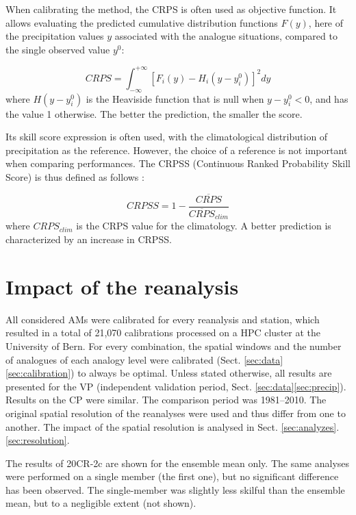 \documentclass{ametsoc}
\begin{document}
When calibrating the method, the CRPS \citep[Continuous Ranked Probability Score,][]{Brown1974, Matheson1976, Hersbach2000} is often used as objective function. It allows evaluating the predicted cumulative distribution functions $F(y)$, here of the precipitation values $y$ associated with the analogue situations, compared to the single observed value $y^{0}$:

\begin{equation}
\label{eq:CRPS}
CRPS = \int_{-\infty}^{+\infty} \left[ F_{i}(y)-H_{i}(y-y_{i}^{0})\right]^{2} dy
\end{equation}
where $H(y-y_{i}^{0})$ is the Heaviside function that is null when $y-y_{i}^{0}<0$, and has the value 1 otherwise. The better the prediction, the smaller the score.

Its skill score expression is often used, with the climatological distribution of precipitation as the reference. However, the choice of a reference is not important when comparing performances. The CRPSS (Continuous Ranked Probability Skill Score) is thus defined as follows \citep{Bradley2011}:

\begin{equation}
\label{eq:CRPSS}
CRPSS = 1-\frac{\overline{CRPS}}{\overline{CRPS}_{clim}}
\end{equation}
where $CRPS_{clim}$ is the CRPS value for the climatology. A better prediction is characterized by an increase in CRPSS.


\section{Impact of the reanalysis}
\label{sec:influence}

All considered AMs were calibrated for every reanalysis and station, which resulted in a total of 21,070 calibrations processed on a HPC cluster at the University of Bern. For every combination, the spatial windows and the number of analogues of each analogy level were calibrated (Sect. \ref{sec:data}\ref{sec:calibration}) to always be optimal. Unless stated otherwise, all results are presented for the VP (independent validation period, Sect. \ref{sec:data}\ref{sec:precip}). Results on the CP were similar. The comparison period was 1981--2010. The original spatial resolution of the reanalyses were used and thus differ from one to another. The impact of the spatial resolution is analysed in Sect. \ref{sec:analyzes}.\ref{sec:resolution}.

The results of 20CR-2c are shown for the ensemble mean only. The same analyses were performed on a single member (the first one), but no significant difference has been observed. The single-member was slightly less skilful than the ensemble mean, but to a negligible extent (not shown).
\end{document}
